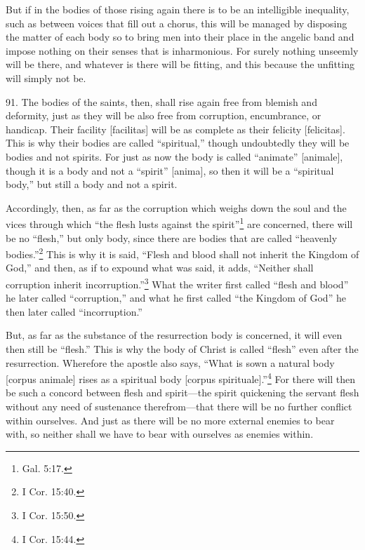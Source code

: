But if in the bodies of those rising again there is to be an intelligible inequality, such as between voices that fill out a chorus, this will be managed by disposing the matter of each body so to bring men into their place in the angelic band and impose nothing on their senses that is inharmonious. For surely nothing unseemly will be there, and whatever is there will be fitting, and this because the unfitting will simply not be.

91. The bodies of the saints, then, shall rise again free from blemish and deformity, just as they will be also free from corruption, encumbrance, or handicap. Their facility [facilitas] will be as complete as their felicity [felicitas]. This is why their bodies are called ``spiritual,'' though undoubtedly they will be bodies and not spirits. For just as now the body is called ``animate'' [animale], though it is a body and not a ``spirit'' [anima], so then it will be a ``spiritual body,'' but still a body and not a spirit.

Accordingly, then, as far as the corruption which weighs down the soul and the vices through which ``the flesh lusts against the spirit''\footnote{Gal. 5:17.} are concerned, there will be no ``flesh,'' but only body, since there are bodies that are called ``heavenly bodies.''\footnote{I Cor. 15:40.} This is why it is said, ``Flesh and blood shall not inherit the Kingdom of God,'' and then, as if to expound what was said, it adds, ``Neither shall corruption inherit incorruption.''\footnote{I Cor. 15:50.} What the writer first called ``flesh and blood'' he later called ``corruption,'' and what he first called ``the Kingdom of God'' he then later called ``incorruption.''

But, as far as the substance of the resurrection body is concerned, it will even then still be ``flesh.'' This is why the body of Christ is called ``flesh'' even after the resurrection. Wherefore the apostle also says, ``What is sown a natural body [corpus animale] rises as a spiritual body [corpus spirituale].''\footnote{I Cor. 15:44.} For there will then be such a concord between flesh and spirit—the spirit quickening the servant flesh without any need of sustenance therefrom—that there will be no further conflict within ourselves. And just as there will be no more external enemies to bear with, so neither shall we have to bear with ourselves as enemies within.

